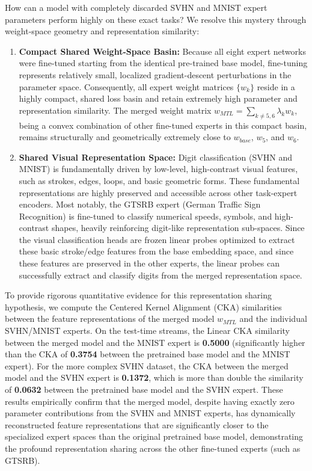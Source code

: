How can a model with completely discarded SVHN and MNIST expert parameters perform highly on these exact tasks? We resolve this mystery through weight-space geometry and representation similarity:
\begin{enumerate}
    \item {\bf Compact Shared Weight-Space Basin:} Because all eight expert networks were fine-tuned starting from the identical pre-trained base model, fine-tuning represents relatively small, localized gradient-descent perturbations in the parameter space. Consequently, all expert weight matrices $\{w_k\}$ reside in a highly compact, shared loss basin and retain extremely high parameter and representation similarity. The merged weight matrix $w_{MTL} = \sum_{k \neq 5,6} \lambda_k w_k$, being a convex combination of other fine-tuned experts in this compact basin, remains structurally and geometrically extremely close to $w_{base}$, $w_5$, and $w_6$.
    \item {\bf Shared Visual Representation Space:} Digit classification (SVHN and MNIST) is fundamentally driven by low-level, high-contrast visual features, such as strokes, edges, loops, and basic geometric forms. These fundamental representations are highly preserved and accessible across other task-expert encoders. Most notably, the GTSRB expert (German Traffic Sign Recognition) is fine-tuned to classify numerical speeds, symbols, and high-contrast shapes, heavily reinforcing digit-like representation sub-spaces. Since the visual classification heads are frozen linear probes optimized to extract these basic stroke/edge features from the base embedding space, and since these features are preserved in the other experts, the linear probes can successfully extract and classify digits from the merged representation space.
\end{enumerate}

To provide rigorous quantitative evidence for this representation sharing hypothesis, we compute the Centered Kernel Alignment (CKA) similarities between the feature representations of the merged model $w_{MTL}$ and the individual SVHN/MNIST experts. On the test-time streams, the Linear CKA similarity between the merged model and the MNIST expert is {\bf 0.5000} (significantly higher than the CKA of {\bf 0.3754} between the pretrained base model and the MNIST expert). For the more complex SVHN dataset, the CKA between the merged model and the SVHN expert is {\bf 0.1372}, which is more than double the similarity of {\bf 0.0632} between the pretrained base model and the SVHN expert. These results empirically confirm that the merged model, despite having exactly zero parameter contributions from the SVHN and MNIST experts, has dynamically reconstructed feature representations that are significantly closer to the specialized expert spaces than the original pretrained base model, demonstrating the profound representation sharing across the other fine-tuned experts (such as GTSRB).


